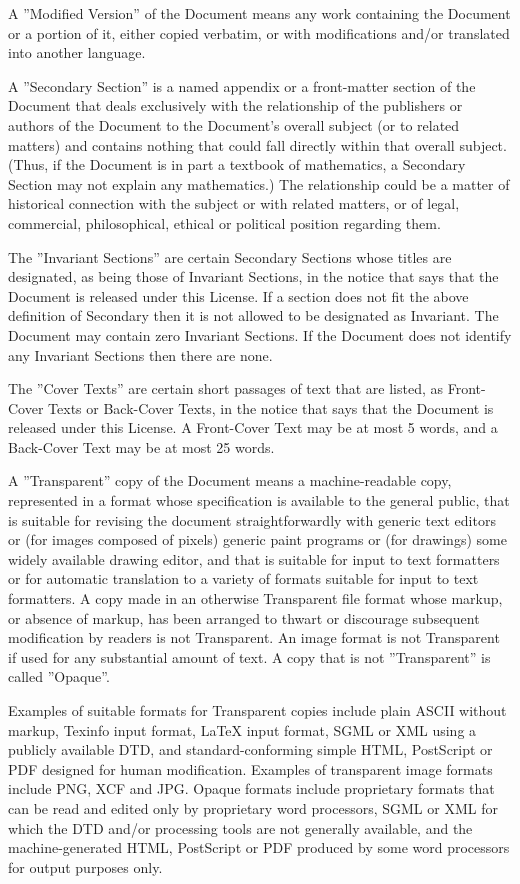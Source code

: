 A ''Modified Version'' of the Document means any work containing the Document or a portion of it, either copied
verbatim, or with modifications and/or translated into another language.

A ''Secondary Section'' is a named appendix or a front-matter section of the Document that deals exclusively with the
relationship of the publishers or authors of the Document to the Document's overall subject (or to related matters) and
contains nothing that could fall directly within that overall subject. (Thus, if the Document is in part a textbook of
mathematics, a Secondary Section may not explain any mathematics.) The relationship could be a matter of historical
connection with the subject or with related matters, or of legal, commercial, philosophical, ethical or political
position regarding them.

The ''Invariant Sections'' are certain Secondary Sections whose titles are designated, as being those of Invariant
Sections, in the notice that says that the Document is released under this License. If a section does not fit the above
definition of Secondary then it is not allowed to be designated as Invariant. The Document may contain zero Invariant
Sections. If the Document does not identify any Invariant Sections then there are none.

The ''Cover Texts'' are certain short passages of text that are listed, as Front-Cover Texts or Back-Cover Texts, in
the notice that says that the Document is released under this License. A Front-Cover Text may be at most 5 words, and a
Back-Cover Text may be at most 25 words.

A ''Transparent'' copy of the Document means a machine-readable copy, represented in a format whose specification is
available to the general public, that is suitable for revising the document straightforwardly with generic text editors
or (for images composed of pixels) generic paint programs or (for drawings) some widely available drawing editor, and
that is suitable for input to text formatters or for automatic translation to a variety of formats suitable for input
to text formatters. A copy made in an otherwise Transparent file format whose markup, or absence of markup, has been
arranged to thwart or discourage subsequent modification by readers is not Transparent. An image format is not
Transparent if used for any substantial amount of text. A copy that is not ''Transparent'' is called ''Opaque''.

Examples of suitable formats for Transparent copies include plain ASCII without markup, Texinfo input format, LaTeX
input format, SGML or XML using a publicly available DTD, and standard-conforming simple HTML, PostScript or PDF
designed for human modification. Examples of transparent image formats include PNG, XCF and JPG. Opaque formats include
proprietary formats that can be read and edited only by proprietary word processors, SGML or XML for which the DTD
and/or processing tools are not generally available, and the machine-generated HTML, PostScript or PDF produced by some
word processors for output purposes only.

